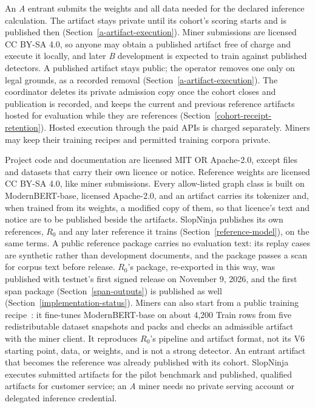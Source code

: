 An \textit{A} entrant submits the weights and all data needed for the declared
inference calculation. The artifact stays private until its cohort's scoring
starts and is published then (Section~\ref{a-artifact-execution}). Miner
submissions are licensed CC BY-SA 4.0, so anyone may obtain a published artifact
free of charge and execute it locally, and later \textit{B} development is
expected to train against published detectors. A published artifact stays
public; the operator removes one only on legal grounds, as a recorded removal
(Section~\ref{a-artifact-execution}). The coordinator deletes its private
admission copy once the cohort closes and publication is recorded, and keeps the current
and previous reference artifacts hosted for evaluation while they are
references (Section~\ref{cohort-receipt-retention}). Hosted execution through
the paid APIs is charged separately.
Miners may keep their training recipes and permitted training corpora private.

Project code and documentation are licensed MIT OR Apache-2.0, except files and
datasets that carry their own licence or notice. Reference weights are licensed
CC BY-SA 4.0, like miner submissions. Every allow-listed graph class is built
on ModernBERT-base, licensed Apache-2.0, and an artifact carries its tokenizer
and, when trained from its weights, a modified copy of them, so that licence's
text and notice are to be published beside the artifacts. SlopNinja publishes its own
references, \(R_0\) and any later reference it trains
(Section~\ref{reference-model}), on the same terms. A public reference package
carries no evaluation text: its replay cases are synthetic rather than
development documents, and the package passes a scan for corpus text before
release. \(R_0\)'s package, re-exported in this way, was published with
testnet's first signed release on November 9, 2026, and the first span
package (Section~\ref{span-outputs}) is published as well
(Section~\ref{implementation-status}). Miners can also start from a public training recipe~\cite{trainingguide}:
it fine-tunes ModernBERT-base on about 4,200 Train rows from five
redistributable dataset snapshots and packs and checks an admissible artifact
with the miner client. It reproduces \(R_0\)'s pipeline and artifact format,
not its V6 starting point, data, or weights, and is not a strong detector. An
entrant artifact that becomes the reference was already published with its
cohort.
SlopNinja executes submitted artifacts for the pilot benchmark and published,
qualified artifacts for customer service; an \textit{A} miner needs no private
serving account or delegated inference credential.

